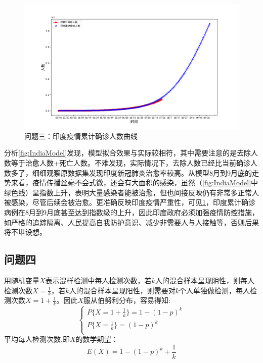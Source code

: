 \documentclass[withoutpre]{cumcmthesis} %
\begin{document}
\begin{figure}[!h]
    \centering
    \includegraphics[width=1.0\textwidth]{figures/cumulative.png}
    \caption{问题三：印度疫情累计确诊人数曲线}
    \label{fig:cumulative}
\end{figure}

分析\cref{fig:IndiaModel}发现，模型拟合效果与实际较相符，其中需要注意的是去除人数等于治愈人数+死亡人数。不难发现，实际情况下，去除人数已经比当前确诊人数多了，细细观察原数据集发现印度新冠肺炎治愈率较高。从模型8月到9月底的走势来看，疫情传播丝毫不会式微，还会有大面积的感染，虽然（\cref{fig:IndiaModel}中绿色线）呈指数上升，表明大量感染者能被治愈，但也间接反映仍有非常多正常人被感染，尽管后续会被治愈。更准确反映印度疫情严重性，可见\cref{fig:cumulative}，印度累计确诊病例在8月到9月底甚至达到指数级的上升，因此印度政府必须加强疫情防控措施，如严格的追踪隔离、人民提高自我防护意识、减少非需要人与人接触等，否则后果将不堪设想。


\subsection{问题四}

用随机变量$X$表示混样检测中每人检测次数，若$k$人的混合样本呈现阴性，则每人检测次数$X = \frac{1}{k}$，若$k$人的混合样本呈现阳性，则需要对$k$个人单独做检测，每人检测次数$X = 1 + \frac{1}{k}$。因此$X$服从伯努利分布，容易得知:
\begin{equation}
    \left\{\begin{array}{l}
        P\{X=1+\frac{1}{k}\}=1-(1-p)^k \\
        P\{X=\frac{1}{k}\}=(1-p)^k \\
        \end{array}\right.
    \label{equation:1}
\end{equation}
平均每人检测次数,即$X$的数学期望：
\begin{equation}
E(X)=1-(1-p)^k+\frac{1}{k}
\end{equation}
\end{document}
